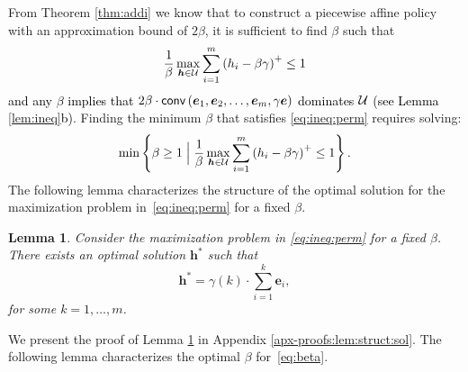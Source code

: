 \documentclass[11pt]{article}
\theoremstyle{plain}
\newtheorem{lemma}[theorem]{Lemma}
\theoremstyle{definition}
\numberwithin{equation}{section}%
\numberwithin{equation}{section}%
\newcommand{\mb}[1]{\ensuremath{\boldsymbol{#1}}}
\newcommand*{\red}{\textcolor{black}}
\begin{document}
From Theorem \ref{thm:addi} we know that to construct a piecewise affine policy with an approximation bound of $2 \beta$, it is sufficient to find $\beta$ such that
\begin{equation}\label{eq:ineq:perm}
 \frac{1}{\beta} \max _{ \mb h \in {\cal U }}  \sum_{i=1}^m \left( h_i -\beta \gamma  \right)^{+} \leq 1
\end{equation}
\red{and any $\beta$ implies that $2\beta\cdot{\sf conv}\left(\mb{e}_1,\mb{e}_2, \ldots,\mb{e}_m, \gamma \mb{e}\right)$ dominates ${\cal U}$ (see Lemma \ref{lem:ineq}b)}. Finding the minimum $\beta$ that satisfies \eqref{eq:ineq:perm} requires solving:
\begin{equation}\label{eq:beta}
\min \left\{ \beta \geq 1 \; \Big\vert \;   \frac{1}{\beta} \max _{ \mb h \in {\cal U }}  \sum_{i=1}^m \left( h_i -\beta \gamma \right)^{+} \leq 1   \right\}.
\end{equation}
The following lemma characterizes the structure of the optimal solution for the maximization problem in~\eqref{eq:ineq:perm} for a fixed $\beta$. %
\begin{lemma} \label{lem:struct:sol}
Consider the maximization problem in \eqref{eq:ineq:perm} for a fixed $\beta$. There exists an optimal solution $\mb h^*$ such that
\[ \mb h^* = \gamma(k) \cdot \sum_{i=1}^k \mb e_i,\]
for some $k=1,\ldots,m$.
\end{lemma}
We present the proof of Lemma \ref{lem:struct:sol} in Appendix \ref{apx-proofs:lem:struct:sol}. The following lemma characterizes the optimal $\beta$ for~\eqref{eq:beta}.
\end{document}
